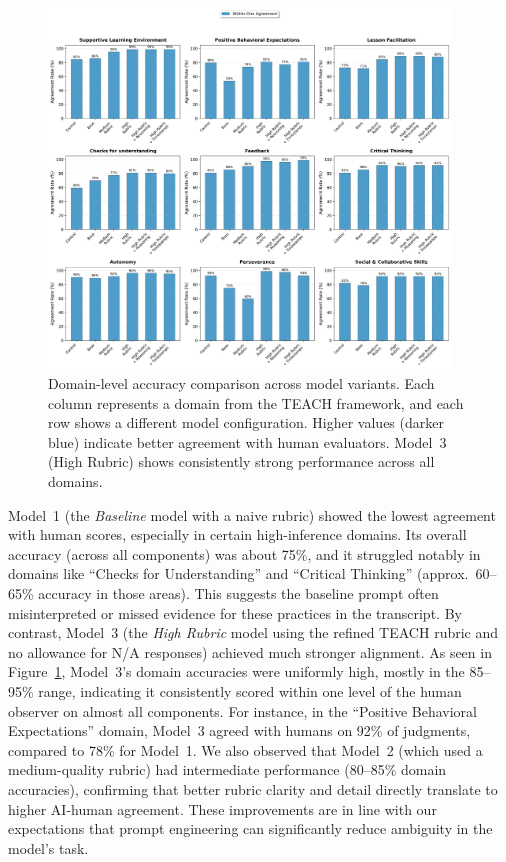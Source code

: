 \documentclass[12pt]{article}
\begin{document}
\begin{figure}[H]\centering
\includegraphics[width=0.95\textwidth]{domain_accuracy_analysis.png}
\caption{Domain-level accuracy comparison across model variants. Each column represents a domain from the TEACH framework, and each row shows a different model configuration. Higher values (darker blue) indicate better agreement with human evaluators. Model~3 (High Rubric) shows consistently strong performance across all domains.}
\label{fig:domain-accuracy}
\end{figure} Model~1 (the \textit{Baseline} model with a naive rubric) showed the lowest agreement with human scores, especially in certain high-inference domains. Its overall accuracy (across all components) was about 75\%, and it struggled notably in domains like “Checks for Understanding” and “Critical Thinking” (approx.\ 60–65\% accuracy in those areas). This suggests the baseline prompt often misinterpreted or missed evidence for these practices in the transcript. By contrast, Model~3 (the \textit{High Rubric} model using the refined TEACH rubric and no allowance for N/A responses) achieved much stronger alignment. As seen in Figure~\ref{fig:domain-accuracy}, Model~3’s domain accuracies were uniformly high, mostly in the 85–95\% range, indicating it consistently scored within one level of the human observer on almost all components. For instance, in the “Positive Behavioral Expectations” domain, Model~3 agreed with humans on 92\% of judgments, compared to 78\% for Model~1. We also observed that Model~2 (which used a medium-quality rubric) had intermediate performance (80–85\% domain accuracies), confirming that better rubric clarity and detail directly translate to higher AI-human agreement. These improvements are in line with our expectations that prompt engineering can significantly reduce ambiguity in the model’s task.
\end{document}
